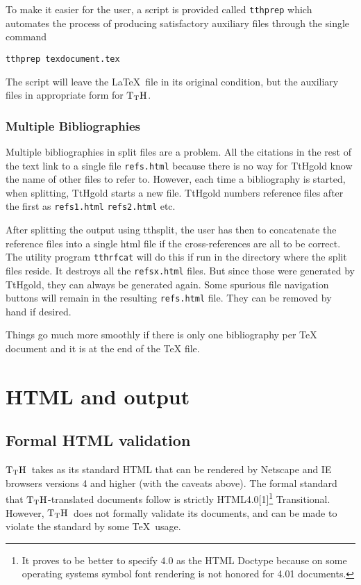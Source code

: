 \documentclass[12pt]{article}
\def\TtH{$\rm{}T_TH$}
\begin{document}
To make it easier for the user, a script is provided called
\verb!tthprep! which automates the process of producing satisfactory
auxiliary files through the single command

\begin{verbatim}
tthprep texdocument.tex
\end{verbatim}

\noindent The script will leave the \LaTeX\ file in its original condition,
but the auxiliary files in appropriate form for \TtH.

\subsubsection{Multiple Bibliographies}
Multiple bibliographies in split files are a problem. All the
citations in the rest of the text link to a single file
\verb!refs.html! because there is no way for TtHgold know the name of other
files to refer to. However, each time a bibliography is started,
when splitting, TtHgold starts a new file. TtHgold numbers reference
files after the first as \verb!refs1.html! \verb!refs2.html!
etc. 

After splitting the output using tthsplit, the user has then to
concatenate the reference files into a single html file if the
cross-references are all to be correct. The utility program
\verb!tthrfcat! will do this if run in the directory where the split
files reside. It destroys all the \verb!refsx.html! files. But since those
were generated by TtHgold, they can always be generated again. Some
spurious file navigation buttons will remain in the resulting
\verb!refs.html! file. They can be removed by hand if desired.

Things go much more smoothly if there is only one bibliography per TeX
document and it is at the end of the TeX file.



\section{HTML and output}
\subsection{Formal HTML validation}
 \TtH\ takes as its standard HTML that
can be rendered by Netscape and IE browsers versions 4 and higher
(with the caveats above).  The formal standard that \TtH-translated
documents follow is strictly HTML4.0[1]\footnote{It proves to be
  better to specify 4.0 as the HTML Doctype because on some operating
  systems symbol font rendering is not honored for 4.01 documents.}
Transitional. However, \TtH\ does
not formally validate its documents, and can be made to violate the
standard by some \TeX\ usage.
\end{document}
